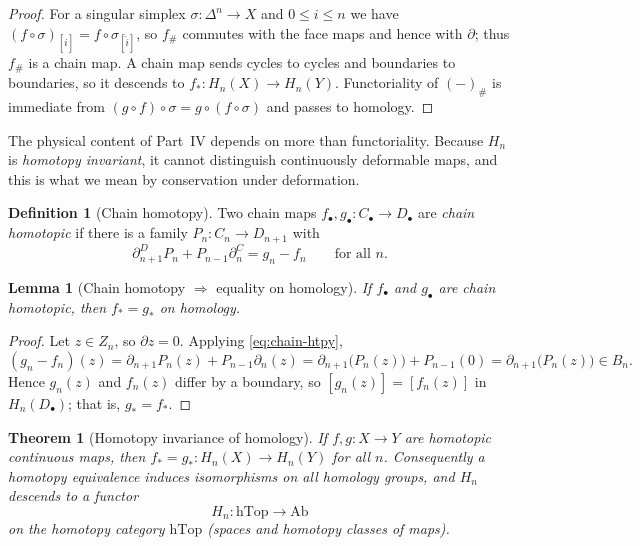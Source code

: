 \documentclass[12pt]{article}
\newtheorem{theorem}{Theorem}[section]
\newtheorem{lemma}[lemma]{Lemma}
\theoremstyle{definition}
\newtheorem{definition}[definition]{Definition}
\theoremstyle{remark}
\newcommand{\hTop}{\mathrm{hTop}}
\newcommand{\Ab}{\mathrm{Ab}}
\begin{document}
\begin{proof}
For a singular simplex $\sigma\colon\Delta^n\to X$ and $0\le i\le n$ we have
$(f\circ\sigma)_{[\hat i]}=f\circ\sigma_{[\hat i]}$, so $f_\#$ commutes with the
face maps and hence with $\partial$; thus $f_\#$ is a chain map. A chain map sends
cycles to cycles and boundaries to boundaries, so it descends to
$f_*\colon H_n(X)\to H_n(Y)$. Functoriality of $(-)_\#$ is immediate from
$(g\circ f)\circ\sigma=g\circ(f\circ\sigma)$ and passes to homology.
\end{proof}

The physical content of Part~IV depends on more than functoriality. Because
$H_n$ is \emph{homotopy invariant}, it cannot distinguish continuously
deformable maps, and this is what we mean by conservation under deformation.

\begin{definition}[Chain homotopy]
\label{def:chain-homotopy}
Two chain maps $f_\bullet,g_\bullet\colon C_\bullet\to D_\bullet$ are
\emph{chain homotopic} if there is a family $P_n\colon C_n\to D_{n+1}$ with
\begin{equation}
\label{eq:chain-htpy}
  \partial^D_{n+1}P_n + P_{n-1}\partial^C_n = g_n - f_n\qquad\text{for all }n .
\end{equation}
\end{definition}

\begin{lemma}[Chain homotopy $\Rightarrow$ equality on homology]
\label{lem:chainhtpy-homology}
If $f_\bullet$ and $g_\bullet$ are chain homotopic, then $f_*=g_*$ on homology.
\end{lemma}

\begin{proof}
Let $z\in Z_n$, so $\partial z=0$. Applying \eqref{eq:chain-htpy},
\[
  (g_n-f_n)(z) = \partial_{n+1}P_n(z) + P_{n-1}\partial_n(z)
  = \partial_{n+1}\bigl(P_n(z)\bigr) + P_{n-1}(0)
  = \partial_{n+1}\bigl(P_n(z)\bigr)\in B_n .
\]
Hence $g_n(z)$ and $f_n(z)$ differ by a boundary, so $[g_n(z)]=[f_n(z)]$ in
$H_n(D_\bullet)$; that is, $g_*=f_*$.
\end{proof}

\begin{theorem}[Homotopy invariance of homology]
\label{thm:homotopy-inv}
If $f,g\colon X\to Y$ are homotopic continuous maps, then $f_*=g_*\colon
H_n(X)\to H_n(Y)$ for all $n$. Consequently a homotopy equivalence induces
isomorphisms on all homology groups, and $H_n$ descends to a functor
\[
  H_n\colon \hTop \longrightarrow \Ab
\]
on the homotopy category $\hTop$ (spaces and homotopy classes of maps).
\end{theorem}
\end{document}

